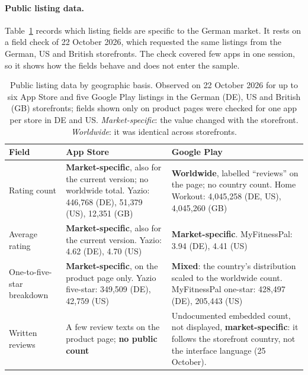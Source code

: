 \paragraph{Public listing data.} Table~\ref{tab:storefront-fields} records which listing fields
are specific to the German market. It rests on a field check of 22 October 2026, which
requested the same listings from the German, US and British storefronts. The check covered few
apps in one session, so it shows how the fields behave and does not enter the sample.

\begin{table}[H]
\centering
\begin{singlespace}
\caption[Public listing data by geographic basis]{Public listing data by geographic basis. Observed on 22 October 2026
for up to six App Store and five Google Play listings in the German (DE), US
and British (GB) storefronts; fields shown only on product pages were checked
for one app per store in DE and US\@. \emph{Market-specific}: the value changed
with the storefront. \emph{Worldwide}: it was identical across storefronts.
}
\label{tab:storefront-fields}
\small
\setlength{\aboverulesep}{0.25ex}\setlength{\belowrulesep}{0.35ex}
\begin{tabularx}{\textwidth}{@{}>{\raggedright\arraybackslash}p{2.3cm}>{\raggedright\arraybackslash}X>{\raggedright\arraybackslash}X@{}}
\toprule
\textbf{Field} & \textbf{App Store} & \textbf{Google Play} \\
\midrule
Rating count & \textbf{Market-specific}, also for the current version; no
  worldwide total. Yazio: 446{,}768 (DE), 51{,}379 (US), 12{,}351 (GB)
  & \textbf{Worldwide}, labelled \enquote{reviews} on the page; no country
  count. Home Workout: 4{,}045{,}258 (DE, US), 4{,}045{,}260 (GB) \\
\midrule
Average rating & \textbf{Market-specific}, also for the current version.
  Yazio: 4.62 (DE), 4.70 (US)
  & \textbf{Market-specific}. MyFitnessPal: 3.94 (DE), 4.41 (US) \\
\midrule
One-to-five-star breakdown & \textbf{Market-specific}, on the product page
  only. Yazio five-star: 349{,}509 (DE), 42{,}759 (US)
  & \textbf{Mixed}: the country's distribution scaled to the worldwide count.
  MyFitnessPal one-star: 428{,}497 (DE), 205{,}443 (US) \\
\midrule
Written reviews & A few review texts on the product page; \textbf{no public
  count}
  & Undocumented embedded count, not displayed, \textbf{market-specific}: it
  follows the storefront country, not the interface language (25 October).

\end{tabularx}
\end{singlespace}
\end{table}

